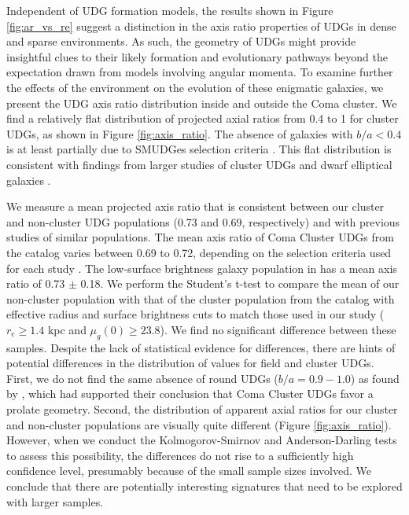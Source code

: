 \documentclass[twocolumn,tighten]{aastex63}
\begin{document}

Independent of UDG formation models, 
the results shown in Figure \ref{fig:ar_vs_re} suggest a distinction in the axis ratio properties of UDGs in dense and sparse environments. As such, 
the geometry of UDGs might provide insightful clues to their likely formation and evolutionary pathways beyond the expectation drawn from models involving angular momenta. To examine further the effects of the environment on the evolution of these enigmatic galaxies, we present the UDG axis ratio distribution inside and outside the Coma cluster. We find a relatively flat distribution of projected axial ratios from 0.4 to 1 for cluster UDGs, as shown in Figure \ref{fig:axis_ratio}.
The absence of galaxies with $b/a < 0.4$ is at least partially due to SMUDGes selection criteria \citep{Zaritsky19}.
This flat distribution is consistent with findings from larger studies of cluster UDGs \citep{Koda2015, Burkert2017} and dwarf elliptical galaxies \citep{Chen2010, Lisker2009}.

We measure a mean projected axis ratio that is consistent between our cluster and non-cluster UDG populations (0.73 and 0.69, respectively) and with previous studies of similar populations. The mean axis ratio of Coma Cluster UDGs from the \cite{Yagi2016} catalog varies between 0.69 to 0.72, depending on the selection criteria used for each study \citep{Koda2015, Yagi2016, Burkert2017}. The low-surface brightness galaxy population in \cite{Chen2010} has a mean axis ratio of 0.73 $\pm$ 0.18. We perform the Student's t-test to compare the mean of our non-cluster population with that of the cluster population from the \cite{Yagi2016} catalog with effective radius and surface brightness cuts to match those used in our study ($r_e\geq 1.4$ kpc and $\mu_g(0) \geq 23.8$). We find no significant difference between these samples. Despite the lack of statistical evidence for differences, there are hints of potential differences in the distribution of values for field and cluster UDGs. First, we do not find the same absence of round UDGs ($b/a = 0.9 - 1.0$) as found by \cite{Burkert2017}, which had supported their conclusion that Coma Cluster UDGs favor a prolate geometry.  Second,
the distribution of apparent axial ratios for our cluster and non-cluster populations are visually quite different (Figure \ref{fig:axis_ratio}). However, when we conduct the Kolmogorov-Smirnov and Anderson-Darling tests to assess this possibility, the differences do not rise to a sufficiently high confidence level, presumably because of the small sample sizes involved. We conclude that there are potentially interesting signatures that need to be explored with larger samples.
\end{document}
